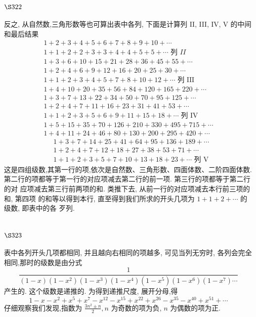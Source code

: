 \section{$\S 322$}

反之, 从自然数,三角形数等也可算出表中各列, 下面是计算列 II, III, IV, V 的中间 和最后结果
\[
\begin{gathered}
1+2+3+4+5+6+7+8+9+10+\cdots \\
1+1+2+2+3+3+4+4+5+5+\cdots \text { 列 } I I \\
1+3+6+10+15+21+28+36+45+55+\cdots \\
1+2+4+6+9+12+16+20+25+30+\cdots \\
1+1+2+3+4+5+7+8+10+12+\cdots \text { 列 III } \\
1+4+10+20+35+56+84+120+165+220+\cdots \\
1+3+7+13+22+34+50+70+95+125+\cdots \\
1+2+4+7+11+16+23+31+41+53+\cdots \\
1+1+2+3+5+6+9+11+15+18+\cdots \text { 列 } \mathrm{IV} \\
1+5+15+35+70+126+210+330+495+715+\cdots \\
1+4+11+24+46+80+130+200+295+420+\cdots
\end{gathered}
\]
\[
\begin{aligned}
& 1+3+7+14+25+41+64+95+136+189+\cdots \\
& 1+2+4+7+12+18+27+38+53+71+\cdots \\
& 1+1+2+3+5+7+10+13+18+23+\cdots \text { 列 } \mathrm{V}
\end{aligned}
\]
这是四组级数,其第一行的项,依次是自然数、三角形数、四面体数、二阶四面体数. 第二行的项都等于第一行的对应项减去第二行的前一项. 第三行的项都等于第二行的对 应项减去第三行前两项的和. 类推下去, 从前一行的对应项减去本行前三项的和, 第四项 的和等以得到本行, 直至得到我们所求的开头几项为 $1+1+2+\cdots$ 的级数, 即表中的各 歹列.

\section{$\S 323$}

表中各列开头几项都相同, 并且越向右相同的项越多, 可见当列无穷时, 各列会完全 相同,那时的级数是由分式
\[
\frac{1}{(1-x)\left(1-x^{2}\right)\left(1-x^{3}\right)\left(1-x^{4}\right)\left(1-x^{5}\right)\left(1-x^{6}\right)\left(1-x^{7}\right) \cdots}
\]
产生的. 这个级数是递推的. 为得到递推尺度, 展开分母,得
\[
1-x-x^{2}+x^{5}+x^{7}-x^{12}-x^{15}+x^{22}+x^{26}-x^{35}-x^{40}+x^{51}+\cdots
\]
仔细观察我们发现,指数为 $\frac{3 n^{2} \pm n}{2}, n$ 为奇数的项为负, $n$ 为偶数的项为正.


